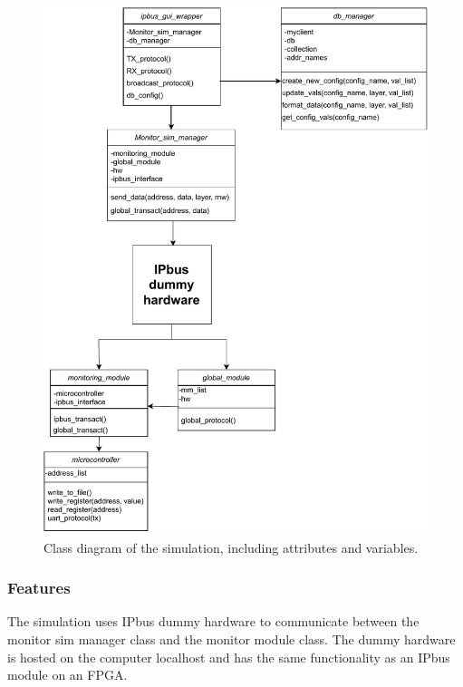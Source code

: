 \documentclass[main.tex]{subfiles}
\begin{document}
\begin{figure}[!ht]
    \centering
    \includegraphics[width=14cm]{images/class chart.pdf}
    \caption{Class diagram of the simulation, including attributes and variables.}
    \label{fig: class_diagram}
\end{figure}
\FloatBarrier


\subsubsection{Features}

The simulation uses IPbus dummy hardware to communicate between the monitor sim manager class and the monitor module class. The dummy hardware is hosted on the computer localhost and has the same functionality as an IPbus module on an FPGA.
\end{document}
